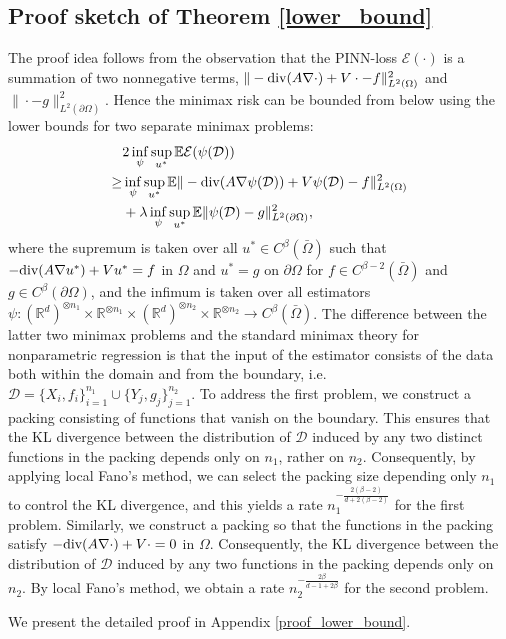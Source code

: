 \documentclass{article}
\newcommand{\R}{\mathbb{R}}
\newcommand{\E}{\mathbb{E}}
\newcommand{\D}{\mathcal{D}}
\renewcommand{\div}{\textnormal{div}}
\theoremstyle{plain}
\theoremstyle{definition}
\theoremstyle{remark}
\begin{document}
\subsection{Proof sketch of Theorem \ref{lower_bound}}
The proof idea follows from the observation that the PINN-loss $\mathcal{E}(\cdot)$ is a summation of two nonnegative terms, $\|-\div(A \nabla \cdot) + V \cdot - f\|_{L^2(\Omega)}^2$ and $\|\cdot - g\|_{L^2(\partial \Omega)}^2$. Hence the minimax risk can be  bounded  from below using  the lower bounds for two separate  minimax problems:
\begin{align*}
    & 2 \inf_\psi \sup_{u^*} \E \mathcal{E}(\psi(\D)) \\ 
    \geq & \inf_\psi \sup_{u^*} \E \|-\div(A \nabla \psi(\D)) + V \psi(\D) - f\|_{L^2(\Omega)}^2  \\ & + \lambda \inf_\psi \sup_{u^*} \E
    \|\psi(\D) - g\|_{L^2(\partial \Omega)}^2,
\end{align*}
where the supremum is taken over all $u^* \in C^\beta(\bar{\Omega})$ such that $-\div(A \nabla u^*) + V u^* = f$ in $\Omega$ and $u^* = g$ on $\partial \Omega$ for $f \in C^{\beta - 2}(\bar{\Omega})$ and $g \in C^\beta(\partial \Omega)$, and the infimum is taken over all estimators $\psi: (\R^{d})^{\otimes n_1} \times \R^{\otimes n_1} \times (\R^d)^{\otimes n_2} \times \R^{\otimes n_2}\to C^\beta(\bar{\Omega})$. The difference between the latter two minimax problems and the standard minimax theory for nonparametric regression is that the input of the estimator consists of the data both within the domain and from the boundary, i.e. $\D = \{X_i, f_i\}_{i=1}^{n_1} \cup \{Y_j, g_j\}_{j=1}^{n_2}$. To address the first problem, we construct a packing consisting of functions that vanish on the boundary. This ensures that the KL divergence between the distribution of $\D$ induced by any two distinct functions in the packing depends only on $n_1$, rather on $n_2$. Consequently, by applying local Fano's method, we can select the packing size depending only $n_1$ to control the KL divergence, and this yields a rate $n_1^{-\frac{2(\beta-2)}{d + 2(\beta-2)}}$ for the first problem. Similarly, we construct a packing so that the functions in the packing satisfy $-\div(A \nabla \cdot ) + V \cdot = 0$ in $\Omega$. Consequently, the KL divergence between the distribution of $\D$ induced by any two functions in the packing depends only on $n_2$. By local Fano's method, we obtain a rate $n_2^{-\frac{2\beta}{d-1 + 2\beta}}$ for the second problem. 


 We present the detailed proof in Appendix \ref{proof_lower_bound}.
    
\end{document}

